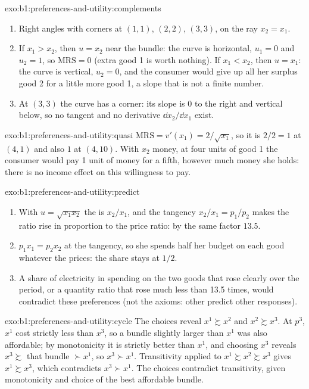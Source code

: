 \begin{solution}{exo:b1:preferences-and-utility:complements}
\begin{enumerate}
  \item Right angles with corners at $(1, 1)$, $(2, 2)$, $(3, 3)$, on the ray $x_2 = x_1$.
  \item If $x_1 > x_2$, then $u = x_2$ near the bundle: the curve is horizontal, $u_1 = 0$ and $u_2 = 1$, so $\mathrm{MRS} = 0$ (extra good 1 is worth nothing). If $x_1 < x_2$, then $u = x_1$: the curve is vertical, $u_2 = 0$, and the consumer would give up all her surplus good 2 for a little more good 1, a slope that is not a finite number.
  \item At $(3, 3)$ the curve has a corner: its slope is $0$ to the right and vertical below, so no tangent and no derivative $\dd x_2/\dd x_1$ exist.
\end{enumerate}
\end{solution}

\begin{solution}{exo:b1:preferences-and-utility:quasi}
$\mathrm{MRS} = v'(x_1) = 2/\sqrt{x_1}$, so it is $2/2 = 1$ at $(4, 1)$ and
also $1$ at $(4, 10)$. With $x_2$ money, at four units of good 1 the
consumer would pay 1 unit of money for a fifth, however much money she
holds: there is no income effect on this willingness to pay.
\end{solution}

\begin{solution}{exo:b1:preferences-and-utility:predict}
\begin{enumerate}
  \item With $u = \sqrt{x_1x_2}$ the  is $x_2/x_1$, and the tangency
    $x_2/x_1 = p_1/p_2$ makes the ratio rise in proportion to the price
    ratio: by the same factor $13.5$.
  \item $p_1x_1 = p_2x_2$ at the tangency, so she spends half her budget on
    each good whatever the prices: the share stays at $1/2$.
  \item A share of electricity in spending on the two goods that rose
    clearly over the period, or a quantity ratio that rose much less than
    13.5 times, would contradict these preferences (not the axioms: other
     predict other responses).
\end{enumerate}
\end{solution}

\begin{solution}{exo:b1:preferences-and-utility:cycle}
The choices reveal $x^1 \succsim x^2$ and $x^2 \succsim x^3$. At $p^3$, $x^1$ cost
strictly less than $x^3$, so a bundle slightly larger than $x^1$ was also
affordable; by monotonicity it is strictly better than $x^1$, and choosing
$x^3$ reveals $x^3 \succsim$ that bundle $\succ x^1$, so $x^3 \succ x^1$. Transitivity
applied to $x^1 \succsim x^2 \succsim x^3$ gives $x^1 \succsim x^3$, which contradicts
$x^3 \succ x^1$. The choices contradict transitivity, given monotonicity and
choice of the best affordable bundle.
\end{solution}

